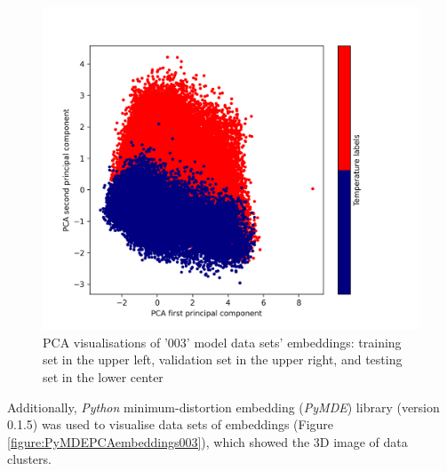 \documentclass[12pt]{article}
\begin{document}
\begin{figure}[h!]
		\includegraphics[scale=0.45]{003_test_v2_PCA.png}

		\caption{PCA visualisations of '003' model data sets' embeddings: training set
				in the upper left, validation set in the upper right, and 
				testing set in the lower center}
		\label{figure:ScikitPCAembeddings003}
	\end{figure}
	
	Additionally, \textit{Python} minimum-distortion embedding (\textit{PyMDE}) 
	library (version 0.1.5) was used to visualise data sets of embeddings 
	(Figure \ref{figure:PyMDEPCAembeddings003}), which showed the 3D image
	of data clusters.
\end{document}
